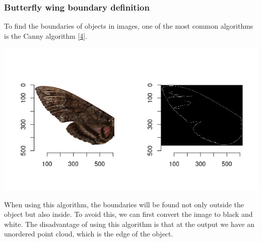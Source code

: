 \documentclass[
]{article}
\let\origfigure\figure
\let\endorigfigure\endfigure
\renewenvironment{figure}[1][2] {
    \expandafter\origfigure\expandafter[H]
} {
    \endorigfigure
}
\begin{document}
\hypertarget{butterfly-wing-boundary-definition}{%
\subsubsection{Butterfly wing boundary
definition}\label{butterfly-wing-boundary-definition}}

To find the boundaries of objects in images, one of the most common
algorithms is the Canny algorithm
{[}\protect\hyperlink{ref-Canny-edge}{4}{]}.

\begin{figure}
\centering
\includegraphics[width=7.29167in,height=\textheight]{./img/Canny_edge_0.png}
\caption{Finding edges in a color image}
\end{figure}

When using this algorithm, the boundaries will be found not only outside
the object but also inside. To avoid this, we can first convert the
image to black and white. The disadvantage of using this algorithm is
that at the output we have an unordered point cloud, which is the edge
of the object.
\end{document}
